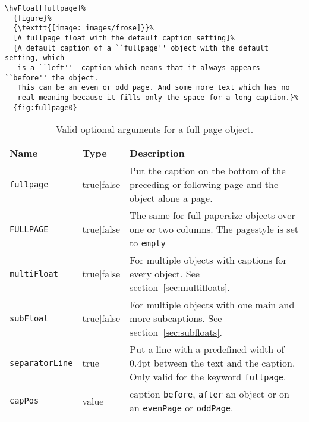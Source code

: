 \documentclass[twoside,paper=a4,usegeometry]{scrartcl}
\makeatletter
\def\Lkeyword#1{\texttt{#1}\index{#1@\texttt{#1} (keyword)}}
\def\Lkeyval#1{\texttt{#1}\index{#1@\texttt{#1} (value)}}
\makeatother
\begin{document}
\begin{lstlisting}
\hvFloat[fullpage]%
  {figure}%
  {\texttt{[image: images/frose]}}%
  [A fullpage float with the default caption setting]%
  {A default caption of a ``fullpage'' object with the default setting, which
   is a ``left''  caption which means that it always appears ``before'' the object.
   This can be an even or odd page. And some more text which has no
   real meaning because it fills only the space for a long caption.}%
  {fig:fullpage0}
\end{lstlisting}






\begin{table}[!h]
\caption{Valid optional arguments for a full page object.}\label{tab:fullpage}
\centering
 \begin{tabularx}{\linewidth}{>{\small\ttfamily}l|>{\small\ttfamily}l|X}\toprule
  \rmfamily Name    & \rmfamily Type        & Description\\\midrule
\Lkeyword{fullpage} & true|false & Put the caption on the bottom of the preceding or following page and the object alone a page.\\


\Lkeyword{FULLPAGE} & true|false & The same for full papersize objects over one or two columns. 
The pagestyle is set to \texttt{empty}\\

\Lkeyword{multiFloat} & true|false & For multiple objects with captions for every object. See section~\vref{sec:multifloats}.\\

\Lkeyword{subFloat} & true|false & For multiple objects with one main and more subcaptions. See section~\vref{sec:subfloats}.\\

\Lkeyword{separatorLine} & true & Put a line with a predefined width of 0.4pt between
    the text and the caption. Only valid for the keyword \Lkeyword{fullpage}.\\
\Lkeyword{capPos}  & value
	 & caption \Lkeyval{before}, \Lkeyval{after} an object or on an
		    \Lkeyval{evenPage} or \Lkeyval{oddPage}.\\
\bottomrule
 \end{tabularx}%
\end{table}
\end{document}
